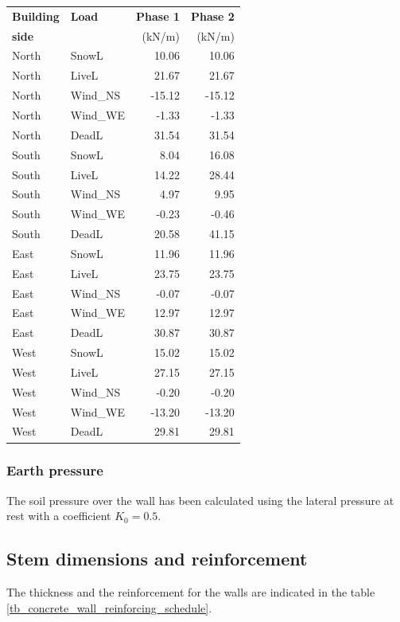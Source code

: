\begin{center}
  \begin{tabular}{|l|l|r|r|}
\hline
\textbf{Building} & \textbf{Load} & \textbf{Phase 1} & \textbf{Phase 2}\\
\textbf{side} &  & (kN/m) & (kN/m)\\
\hline
North & SnowL & 10.06 & 10.06\\
North & LiveL & 21.67 & 21.67\\
North & Wind\_NS & -15.12 & -15.12\\
North & Wind\_WE & -1.33 & -1.33\\
North & DeadL & 31.54 & 31.54\\
\hline
South & SnowL & 8.04 & 16.08\\
South & LiveL & 14.22 & 28.44\\
South & Wind\_NS & 4.97 & 9.95\\
South & Wind\_WE & -0.23 & -0.46\\
South & DeadL & 20.58 & 41.15\\
\hline
East & SnowL & 11.96 & 11.96\\
East & LiveL & 23.75 & 23.75\\
East & Wind\_NS & -0.07 & -0.07\\
East & Wind\_WE & 12.97 & 12.97\\
East & DeadL & 30.87 & 30.87\\
\hline
West & SnowL & 15.02 & 15.02\\
West & LiveL & 27.15 & 27.15\\
West & Wind\_NS & -0.20 & -0.20\\
West & Wind\_WE & -13.20 & -13.20\\
West & DeadL & 29.81 & 29.81\\
\hline
\end{tabular}
\end{center}

\subsubsection{Earth pressure}
The soil pressure over the wall has been calculated using the lateral pressure at rest with a coefficient $K_0= 0.5$.

\subsection{Stem dimensions and reinforcement}
The thickness and the reinforcement for the walls are indicated in the table \ref{tb_concrete_wall_reinforcing_schedule}.

